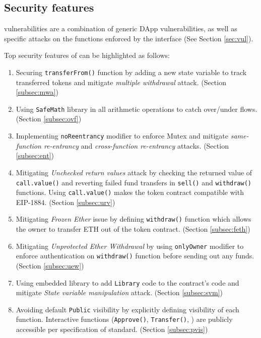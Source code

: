 \subsection{Security features}
\erc vulnerabilities are a combination of generic DApp vulnerabilities, as well as specific attacks on the functions enforced by the \erc interface (See Section \ref{sec:vul}). {\blue Top security features of \sys can be highlighted as follows:
\begin{enumerate}[noitemsep,topsep=0pt]
	\item Securing \texttt{transferFrom()} function by adding a new state variable to track transferred tokens and mitigate \textit{multiple withdrawal} attack. (Section \ref{subsec:mwa})

	\item Using \texttt{SafeMath} library in all arithmetic operations to catch over/under flows. (Section \ref{subsec:ovf})

	\item Implementing \texttt{noReentrancy} modifier to enforce Mutex and mitigate \textit{same-function re-entrancy} and \textit{cross-function re-entrancy} attacks. (Section \ref{subsec:ent})

	\item Mitigating \textit{Unchecked return values} attack by checking the returned value of \texttt{call.value()} and reverting failed fund transfers in \texttt{sell()} and \texttt{withdraw()} functions. Using \texttt{call.value()} makes the token contract compatible with EIP-1884\cite{EIP1884}. (Section \ref{subsec:urv})

	\item Mitigating \textit{Frozen Ether} issue by defining \texttt{withdraw()} function which allows the owner to transfer ETH out of the token contract. (Section \ref{subsec:feth})

	\item Mitigating \textit{Unprotected Ether Withdrawal} by using \texttt{onlyOwner} modifier to enforce authentication on \texttt{withdraw()} function before sending out any funds. (Section \ref{subsec:uew})

	\item Using embedded library to add \texttt{Library} code to the \erc contract's code and mitigate \textit{State variable manipulation} attack. (Section \ref{subsec:svm})
	
	\item Avoiding default \texttt{Public} visibility by explicitly defining visibility of each function. Interactive functions (\eg \texttt{Approve()}, \texttt{Transfer()}, \etc) are publicly accessible per specification of \erc standard. (Section \ref{subsec:pvis})
\end{enumerate}

}
